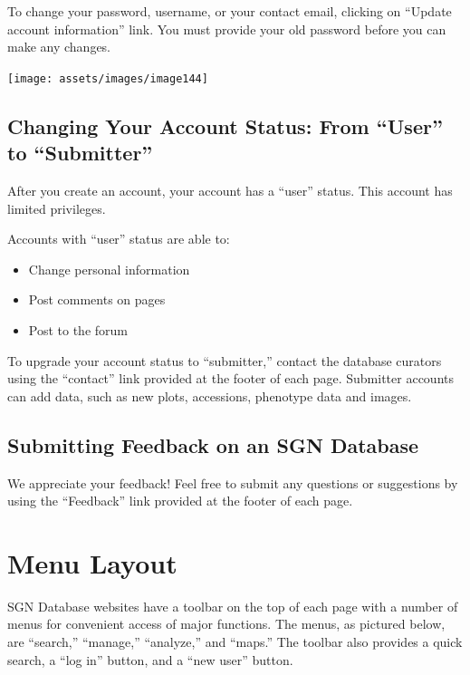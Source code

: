 \documentclass[
  12pt,
]{book}
\providecommand{\tightlist}{%
  \setlength{\itemsep}{0pt}\setlength{\parskip}{0pt}}
\begin{document}
To change your password, username, or your contact email, clicking on ``Update account information'' link. You must provide your old password before you can make any changes.

\begin{center}\texttt{[image: assets/images/image144]} \end{center}

\hypertarget{changing-your-account-status-from-user-to-submitter}{%
\subsection{Changing Your Account Status: From ``User'' to ``Submitter''}\label{changing-your-account-status-from-user-to-submitter}}

After you create an account, your account has a ``user'' status. This account has limited privileges.

Accounts with ``user'' status are able to:

\begin{itemize}
\tightlist
\item
  Change personal information
\item
  Post comments on pages
\item
  Post to the forum
\end{itemize}

To upgrade your account status to ``submitter,'' contact the database curators using the ``contact'' link provided at the footer of each page. Submitter accounts can add data, such as new plots, accessions, phenotype data and images.

\hypertarget{submitting-feedback-on-an-sgn-database}{%
\subsection{Submitting Feedback on an SGN Database}\label{submitting-feedback-on-an-sgn-database}}

We appreciate your feedback! Feel free to submit any questions or suggestions by using the ``Feedback'' link provided at the footer of each page.

\hypertarget{menu-layout}{%
\section{Menu Layout}\label{menu-layout}}

SGN Database websites have a toolbar on the top of each page with a number of menus for convenient access of major functions. The menus, as pictured below, are ``search,'' ``manage,'' ``analyze,'' and ``maps.'' The toolbar also provides a quick search, a ``log in'' button, and a ``new user'' button.
\end{document}
